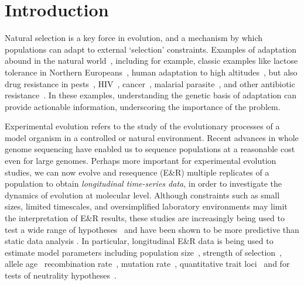 \section{Introduction}
Natural selection is a key force in evolution, and a mechanism by
which populations can adapt to external `selection'
constraints. Examples of adaptation abound in the natural 
world~\cite{going2016fan},
including for example, classic examples like lactose tolerance in
Northern Europeans~\cite{bersaglieri2004genetic}, human adaptation to
high altitudes~\cite{yi2010sequencing,simonson2010genetic}, but also
drug resistance in pests~\cite{daborn2001ddt},
HIV~\cite{Feder2016More},
cancer~\cite{gottesman2002mechanisms,zahreddine2013mechanisms},
malarial parasite~\cite{ariey2014molecular,nair2007recurrent}, and
other antibiotic resistance~\cite{spellberg2008epidemic}. In these
examples, understanding the genetic basis of adaptation can provide
actionable information, underscoring the importance of the problem.


Experimental evolution refers to the study of the evolutionary
processes of a model organism in a controlled
\cite{hegreness2006equivalence,lang2013pervasive,orozco2012adaptation,
  lang2011genetic,barrick2009genome,bollback2007clonal,oz2014strength}
or natural
\cite{maldarelli2013hiv,reid2011new,denef2012situ,winters2012development,
  daniels2013genetic,barrett2008natural,bergland2014genomic}
environment. Recent advances in whole genome sequencing have enabled
us to sequence populations at a reasonable cost even for large
genomes. Perhaps more important for experimental evolution studies, we
can now evolve and resequence (E\&R) multiple replicates of a population to
obtain \emph{longitudinal time-series data}, in order to investigate
the dynamics of evolution at molecular level.  Although constraints
such as small sizes, limited timescales, and oversimplified
laboratory environments may limit the interpretation of E\&R results,
these studies are increasingly being used to test a wide range of
hypotheses~\cite{kawecki2012experimental} and have been shown to be
more predictive than static data analysis
\cite{boyko2008assessing,desai2008polymorphism,sawyer1992population}.
In particular, longitudinal E\&R data is being used to estimate model
parameters including population
size~\cite{williamson1999using,wang2001pseudo,pollak1983new,waples1989generalized,
  Terhorst2015Multi, jonas2016estimating}, strength of
selection~\cite{mathieson2013estimating,illingworth2011distinguishing,Terhorst2015Multi,
  bollback2008estimation,illingworth2012quantifying,malaspinas2012estimating,
  steinrucken2014novel}, allele age~\cite{malaspinas2012estimating}
recombination rate~\cite{Terhorst2015Multi}, mutation
rate~\cite{Barrick2013Genome, Terhorst2015Multi}, quantitative trait
loci~\cite{baldwin2014power} and for tests of neutrality
hypotheses~\cite{feder2014Identifying,Terhorst2015Multi,burke2010genome,bergland2014genomic}.


